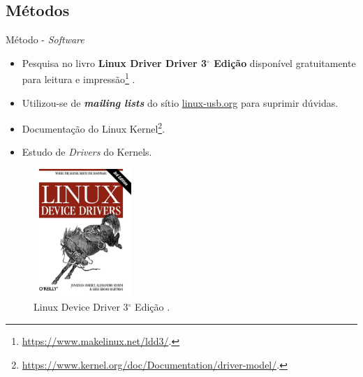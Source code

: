 	\subsection{Métodos}
	\begin{frame}{Método - \textit{Software}}
		\begin{multicols}{2}
					\begin{itemize}
						\item Pesquisa no livro \textbf{Linux Driver Driver 3$^{\circ}$ Edição} disponível gratuitamente para leitura e impressão\footnote{\url{https://www.makelinux.net/ldd3/}.} \cite{corbet2005linux}.
						\item Utilizou-se de \textbf{\textit{mailing lists}} do sítio \url{linux-usb.org} para suprimir dúvidas.
						\item Documentação do Linux Kernel\footnote{\url{https://www.kernel.org/doc/Documentation/driver-model/}.}.
						\item Estudo de \textit{Drivers} do Kernels.
					\end{itemize}
			\columnbreak
				\begin{figure}[p]
					\centering
					\includegraphics[width=0.33\textwidth]{img/livro.jpg}
					\caption{Linux Device Driver 3$^{\circ}$ Edição \cite{corbet2005linux}.}
					\label{fig:ldd3}
				\end{figure}
		\end{multicols}
	\end{frame}

